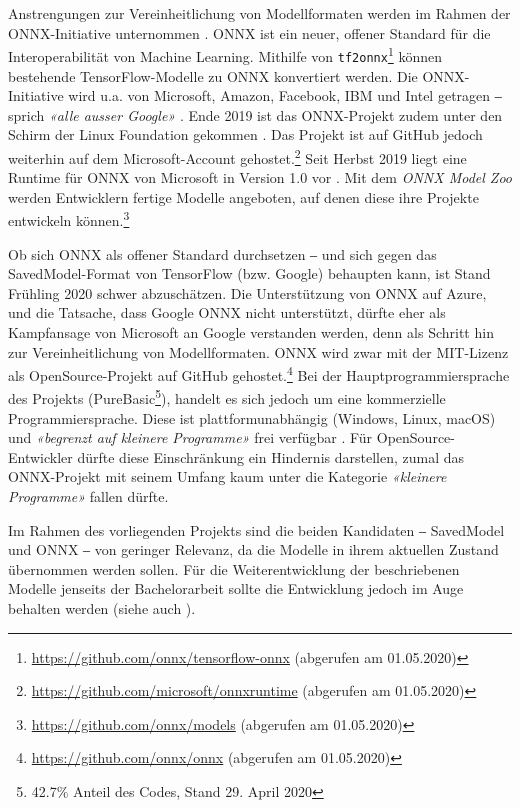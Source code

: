 Anstrengungen zur Vereinheitlichung von Modellformaten werden im Rahmen der ONNX-Initiative unternommen \cite{onnx}. ONNX ist ein neuer, offener Standard für die Interoperabilität von Machine Learning. Mithilfe von \texttt{tf2onnx}\footnote{\url{https://github.com/onnx/tensorflow-onnx} (abgerufen am 01.05.2020)} können bestehende TensorFlow-Modelle zu ONNX konvertiert werden. Die ONNX-Initiative wird u.a. von Microsoft, Amazon, Facebook, IBM und Intel getragen ‒ sprich \textit{«alle ausser Google»} \cite{linuxjournal-onnx}. Ende 2019 ist das ONNX-Projekt zudem unter den Schirm der Linux Foundation gekommen \cite{heise-onnx}. Das Projekt ist auf GitHub jedoch weiterhin auf dem Microsoft-Account gehostet.\footnote{\url{https://github.com/microsoft/onnxruntime} (abgerufen am 01.05.2020)} Seit Herbst 2019 liegt eine Runtime für ONNX von Microsoft in Version 1.0 vor \cite{cloudblogs-onnx}. Mit dem \textit{ONNX Model Zoo} werden Entwicklern fertige Modelle angeboten, auf denen diese ihre Projekte entwickeln können.\footnote{\url{https://github.com/onnx/models} (abgerufen am 01.05.2020)}

Ob sich ONNX als offener Standard durchsetzen ‒ und sich gegen das SavedModel-Format von TensorFlow (bzw. Google) behaupten kann, ist Stand Frühling 2020 schwer abzuschätzen. Die Unterstützung von ONNX auf Azure, und die Tatsache, dass Google ONNX nicht unterstützt, dürfte eher als Kampfansage von Microsoft an Google verstanden werden, denn als Schritt hin zur Vereinheitlichung von Modellformaten. ONNX wird zwar mit der MIT-Lizenz als OpenSource-Projekt auf GitHub gehostet.\footnote{\url{https://github.com/onnx/onnx} (abgerufen am 01.05.2020)} Bei der Hauptprogrammiersprache des Projekts (PureBasic\footnote{42.7\% Anteil des Codes, Stand 29. April 2020}), handelt es sich jedoch um eine kommerzielle Programmiersprache. Diese ist plattformunabhängig (Windows, Linux, macOS) und \textit{«begrenzt auf kleinere Programme»} frei verfügbar \cite{purebasic}. Für OpenSource-Entwickler dürfte diese Einschränkung ein Hindernis darstellen, zumal das ONNX-Projekt mit seinem Umfang kaum unter die Kategorie \textit{«kleinere Programme»} fallen dürfte.

Im Rahmen des vorliegenden Projekts sind die beiden Kandidaten ‒ Saved\-Model und ONNX ‒ von geringer Relevanz, da die Modelle in ihrem aktuellen Zustand übernommen werden sollen. Für die Weiterentwicklung der beschriebenen Modelle jenseits der Bachelorarbeit sollte die Entwicklung jedoch im Auge behalten werden (siehe auch ).
